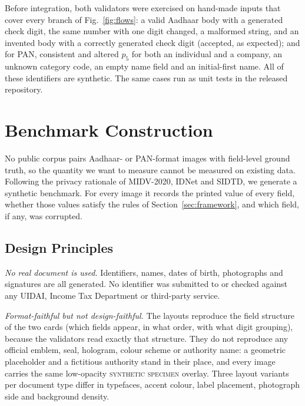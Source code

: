 \documentclass[VANCOUVER,Times1COL]{WileyNJDv5}
\begin{document}
Before integration, both validators were exercised on hand-made inputs
that cover every branch of Fig.~\ref{fig:flows}: a valid Aadhaar body
with a generated check digit, the same number with one digit changed,
a malformed string, and an invented body with a correctly generated
check digit (accepted, as expected); and for PAN, consistent and
altered $p_5$ for both an individual and a company, an unknown category
code, an empty name field and an initial-first name. All of these
identifiers are synthetic. The same cases run as unit tests in the
released repository.

\section{Benchmark Construction}
\label{sec:dataset}

No public corpus pairs Aadhaar- or PAN-format images with field-level
ground truth, so the quantity we want to measure cannot be measured on
existing data. Following the privacy rationale of
MIDV-2020\cite{midv}, IDNet\cite{idnet} and SIDTD\cite{sidtd}, we
generate a synthetic benchmark. For every image it records the printed
value of every field, whether those values satisfy the rules of
Section~\ref{sec:framework}, and which field, if any, was corrupted.

\subsection{Design Principles}
\label{subsec:principles}

\emph{No real document is used.} Identifiers, names, dates of birth,
photographs and signatures are all generated. No identifier was
submitted to or checked against any UIDAI, Income Tax Department or
third-party service.

\emph{Format-faithful but not design-faithful.} The layouts reproduce
the field structure of the two cards (which fields appear, in what
order, with what digit grouping), because the validators read exactly
that structure. They do not reproduce any official emblem, seal, hologram, colour
scheme or authority name: a geometric placeholder and a fictitious
authority stand in their place, and every image carries the same
low-opacity \textsc{synthetic specimen} overlay. Three layout variants
per document type differ in typefaces, accent colour, label placement,
photograph side and background density.
\end{document}
